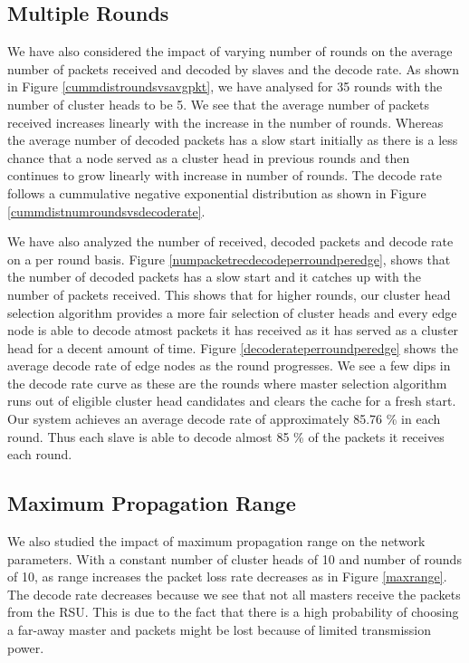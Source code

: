 \documentclass{acm_proc_article-sp}
\begin{document}
\subsection{Multiple Rounds}
\vspace{1 mm}
We have also considered the impact of varying number of rounds on the average number of packets received and decoded by slaves and the decode rate. As shown in Figure \ref{cummdistroundsvsavgpkt}, we have analysed for 35 rounds with the number of cluster heads to be 5. We see that the average number of packets received increases linearly with the increase in the number of rounds. Whereas the average number of decoded packets has a slow start initially as there is a less chance that a node served as a cluster head in previous rounds and then continues to grow linearly with increase in number of rounds. The decode rate  follows a cummulative negative exponential distribution as shown in Figure \ref{cummdistnumroundsvsdecoderate}. 

We have also analyzed the number of received, decoded packets and decode rate on a per round basis. Figure \ref{numpacketrecdecodeperroundperedge}, shows that the number of decoded packets has a slow start and it catches up with the number of packets received. This shows that for higher rounds, our cluster head selection algorithm provides a more fair selection of cluster heads and every edge node is able to decode atmost packets it has received as it has served as a cluster head for a decent amount of time. Figure \ref{decoderateperroundperedge} shows the average decode rate of edge nodes as the round progresses. We see a few dips in the decode rate curve as these are the rounds where master selection algorithm runs out of eligible cluster head candidates and clears the cache for a fresh start. Our system achieves an average decode rate of approximately 85.76 \% in each round. Thus each slave is able to decode almost 85 \% of the packets it receives each round.

\subsection{Maximum Propagation Range}
\vspace{1 mm}
We also studied the impact of maximum propagation range on the network parameters. With a constant number of cluster heads of 10 and number of rounds of 10, as range increases the packet loss rate decreases as in Figure \ref{maxrange}. The decode rate decreases because we see that not all masters receive the packets from the RSU. This is due to the fact that there is a high probability of choosing a far-away master and packets might be lost because of limited transmission power.
\end{document}
